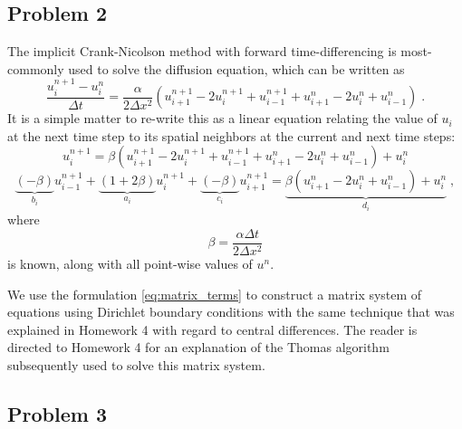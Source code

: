 \documentclass[11pt]{article}
\begin{document}
\subsection{Problem 2}

The implicit Crank-Nicolson method with forward time-differencing is most-commonly used to solve the diffusion equation, which can be written as
\begin{equation}
\frac{u_i^{n+1} - u_i^n}{\Delta t}
=
\frac{\alpha}{2 \Delta x^2}
\left(
u_{i+1}^{n+1} - 2 u_i^{n+1} + u_{i-1}^{n+1} + u_{i+1}^n - 2 u_i^n + u_{i-1}^n
\right)
\;.
\label{eq:prob2_crank}
\end{equation}
It is a simple matter to re-write this as a linear equation relating the value of $u_i$ at the next time step to its spatial neighbors at the current and next time steps:
\begin{equation}
u_i^{n+1}
=
\beta
\left(
u_{i+1}^{n+1} - 2 u_i^{n+1} + u_{i-1}^{n+1} + u_{i+1}^n - 2 u_i^n + u_{i-1}^n
\right)
+ u_i^n
\end{equation}
\begin{equation}
  \underbrace{\left(      -\beta \right)}_{b_i} u_{i-1}^{n+1}
+ \underbrace{\left( 1 + 2 \beta \right)}_{a_i} u_i^{n+1}
+ \underbrace{\left(      -\beta \right)}_{c_i} u_{i+1}^{n+1}
=
\underbrace{\beta \left( u_{i+1}^n - 2 u_i^n + u_{i-1}^n \right) + u_i^n}_{d_i}
\;,
\label{eq:matrix_terms}
\end{equation}
where
\begin{equation}
\beta = \frac{\alpha \Delta t}{2 \Delta x^2}
\end{equation}
is known, along with all point-wise values of $u^n$.

We use the formulation \eqref{eq:matrix_terms} to construct a matrix system of equations using Dirichlet boundary conditions with the same technique that was explained in Homework 4 with regard to central differences. The reader is directed to Homework 4 for an explanation of the Thomas algorithm subsequently used to solve this matrix system.

\subsection{Problem 3}
\end{document}
